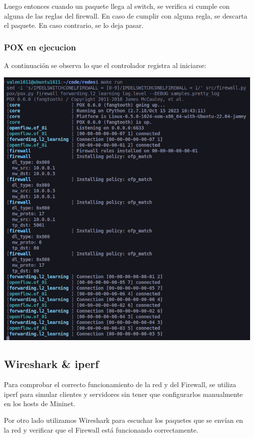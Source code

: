 \documentclass{article}
\begin{document}
Luego entonces cuando un paquete llega al switch, se verifica si cumple con alguna de las reglas del firewall. En caso de cumplir con alguna regla, se descarta el paquete. En caso contrario, se lo deja pasar. 

\subsubsection{POX en ejecucion}

A continuación se observa lo que el controlador registra al iniciarse:
\begin{center}
 \includegraphics[scale=0.45]{pox_init.png}
\end{center}

\subsection{Wireshark \& iperf}\label{wireshark-iperf}

Para comprobar el correcto funcionamiento de la red y del Firewall, se utiliza iperf para simular clientes y servidores sin tener que configurarlos manualmente en los hosts de Mininet. 

Por otro lado utilizamos Wireshark para escuchar los paquetes que se envían en la red y verificar que el Firewall está funcionando correctamente.
\end{document}

